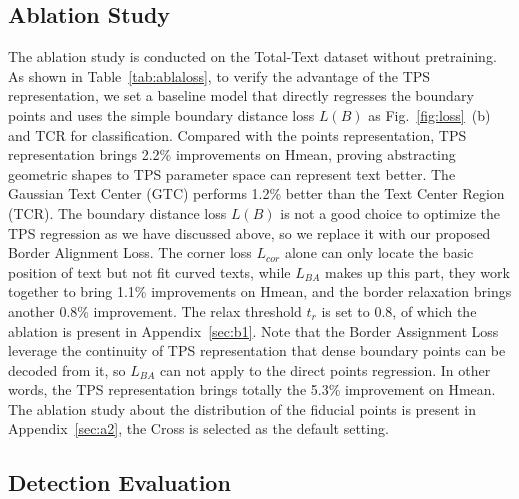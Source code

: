 \documentclass[sigconf]{acmart}
\begin{document}
	\subsection{Ablation Study}
The ablation study is conducted  on the Total-Text dataset without pretraining.
As shown in Table~\ref{tab:ablaloss}, to verify the advantage of the TPS representation, we set a baseline model that directly regresses the boundary points and uses the simple boundary distance loss $L(B)$ as Fig.~\ref{fig:loss}~(b) and TCR for classification.
Compared with the points representation, TPS representation brings 2.2\% improvements on Hmean, proving abstracting geometric shapes to TPS parameter space can represent text better. The Gaussian Text Center (GTC) performs 1.2\% better than the Text Center Region (TCR). The boundary distance loss $L(B)$ is not a good choice to optimize the TPS regression as we have discussed above, so we replace it with our proposed Border Alignment Loss. The corner loss $L_{cor}$ alone can only locate the basic position of text but not fit curved texts, while $L_{BA}$ makes up this part, they work together to bring 1.1\% improvements on Hmean, and the border relaxation brings another 0.8\% improvement. The relax threshold $t_r$ is set to 0.8, of which the ablation is present in Appendix~\ref{sec:b1}. Note that the Border Assignment Loss leverage the continuity of TPS representation that dense boundary points can be decoded from it, so $L_{BA}$ can not apply to the direct points regression. In other words, the TPS representation brings totally the 5.3\% improvement on Hmean.
	The ablation study about the distribution of the fiducial points is present in Appendix~\ref{sec:a2}, the Cross is selected as the default setting.
	
	
	\subsection{
Detection Evaluation}
	
\end{document}
